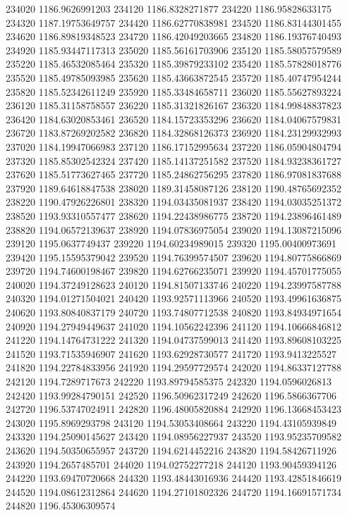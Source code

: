 {234020 1186.9626991203
234120 1186.8328271877
234220 1186.95828633175
234320 1187.19753649757
234420 1186.62770838981
234520 1186.83144301455
234620 1186.89819348523
234720 1186.42049203665
234820 1186.19376740493
234920 1185.93447117313
235020 1185.56161703906
235120 1185.58057579589
235220 1185.46532085464
235320 1185.39879233102
235420 1185.57828018776
235520 1185.49785093985
235620 1185.43663872545
235720 1185.40747954244
235820 1185.52342611249
235920 1185.33484658711
236020 1185.55627893224
236120 1185.31158758557
236220 1185.31321826167
236320 1184.99848837823
236420 1184.63020853461
236520 1184.15723353296
236620 1184.04067579831
236720 1183.87269202582
236820 1184.32868126373
236920 1184.23129932993
237020 1184.19947066983
237120 1186.17152995634
237220 1186.05904804794
237320 1185.85302542324
237420 1185.14137251582
237520 1184.93238361727
237620 1185.51773627465
237720 1185.24862756295
237820 1186.97081837688
237920 1189.64618847538
238020 1189.31458087126
238120 1190.48765692352
238220 1190.47926226801
238320 1194.03435081937
238420 1194.03035251372
238520 1193.93310557477
238620 1194.22438986775
238720 1194.23896461489
238820 1194.06572139637
238920 1194.07836975054
239020 1194.13087215096
239120 1195.0637749437
239220 1194.60234989015
239320 1195.00400973691
239420 1195.15595379042
239520 1194.76399574507
239620 1194.80775866869
239720 1194.74600198467
239820 1194.62766235071
239920 1194.45701775055
240020 1194.37249128623
240120 1194.81507133746
240220 1194.23997587788
240320 1194.01271504021
240420 1193.92571113966
240520 1193.49961636875
240620 1193.80840837179
240720 1193.74807712538
240820 1193.84934971654
240920 1194.27949449637
241020 1194.10562242396
241120 1194.10666846812
241220 1194.14764731222
241320 1194.04737599013
241420 1193.89608103225
241520 1193.71535946907
241620 1193.62928730577
241720 1193.9413225527
241820 1194.22784833956
241920 1194.29597729574
242020 1194.86337127788
242120 1194.7289717673
242220 1193.89794585375
242320 1194.0596026813
242420 1193.99284790151
242520 1196.50962317249
242620 1196.5866367706
242720 1196.53747024911
242820 1196.48005820884
242920 1196.13668453423
243020 1195.8969293798
243120 1194.53053408664
243220 1194.43105939849
243320 1194.25090145627
243420 1194.08956227937
243520 1193.95235709582
243620 1194.50350655957
243720 1194.6214452216
243820 1194.58426711926
243920 1194.2657485701
244020 1194.02752277218
244120 1193.90459394126
244220 1193.69470720668
244320 1193.48443016936
244420 1193.42851846619
244520 1194.08612312864
244620 1194.27101802326
244720 1194.16691571734
244820 1196.45306309574
}
